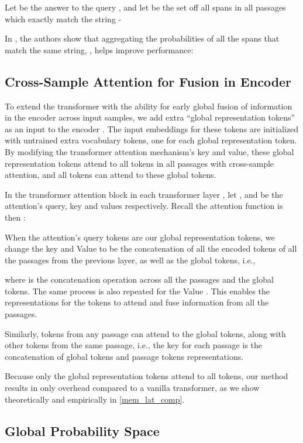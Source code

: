 \documentclass[11pt]{article}
\begin{document}
Let  be the answer to the query , and let  be the set off all spans in all passages which exactly match the string  - 


In \citet{prob-assum}, the authors show that aggregating the probabilities of all the spans that match the same string, , helps improve performance: 


\subsection{Cross-Sample Attention for Fusion in Encoder}
\label{sec:fie}
To extend the transformer with the ability for early global fusion of information in the encoder across input samples, we add  extra ``global representation tokens''  as an input to the encoder . The input embeddings for these tokens are initialized with untrained extra vocabulary tokens, one for each global representation token. By modifying the transformer attention mechanism's key and value, these global representation tokens attend to all tokens in all passages with cross-sample attention, and all tokens can attend to these global tokens.

In the transformer attention block in each transformer layer , let ,  and  be the attention's query, key and values respectively. Recall the attention function is then \cite{transformer}:


When the attention's query tokens  are our global representation tokens, we change the key  and Value  to be the concatenation of all the encoded tokens of all the passages from the previous layer, as well as the global tokens, i.e., 

where  is the concatenation operation across all the passages and the global tokens. The same process is also repeated for the Value . This enables the representations for the tokens  to attend and fuse information from all the passages.

Similarly, tokens from any passage  can attend to the global tokens, along with other tokens from the same passage, i.e., the key for each passage is the concatenation of global tokens and passage tokens representations.


Because only the global representation tokens attend to all tokens, our method results in only  overhead compared to a vanilla transformer, as we show theoretically and empirically in \cref{mem_lat_comp}.


\subsection{Global Probability Space}
\label{sec:glo_prob}
\end{document}
